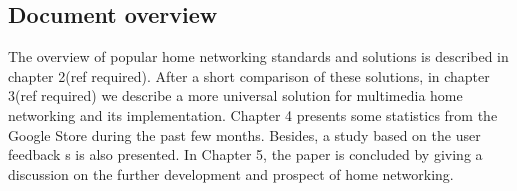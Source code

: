 \subsection{Document overview}
The overview of popular home networking standards and solutions is described in
chapter 2(ref required). After a short comparison of these solutions, in chapter 3(ref required) we
describe a more universal solution for multimedia home networking and its
implementation. Chapter 4 presents some statistics from the Google Store
during the past few months. Besides, a study based on the user feedback
s is also presented. In Chapter 5, the paper is concluded by giving a discussion on the further development and prospect of home networking.
